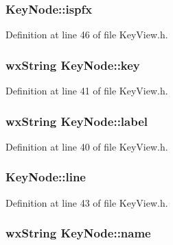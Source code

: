 \subsubsection[{\texorpdfstring{ispfx}{ispfx}}]{ Key\+Node\+::ispfx}\hypertarget{class_key_node_abfc291ad3728582c410dafe5796510cb}{}\label{class_key_node_abfc291ad3728582c410dafe5796510cb}


Definition at line 46 of file Key\+View.\+h.

\subsubsection[{\texorpdfstring{key}{key}}]{\setlength{\rightskip}{0pt plus 5cm}wx\+String Key\+Node\+::key}\hypertarget{class_key_node_a6c7cfedf027aa5f0dc8d5312ede8df73}{}\label{class_key_node_a6c7cfedf027aa5f0dc8d5312ede8df73}


Definition at line 41 of file Key\+View.\+h.

\subsubsection[{\texorpdfstring{label}{label}}]{\setlength{\rightskip}{0pt plus 5cm}wx\+String Key\+Node\+::label}\hypertarget{class_key_node_a2b822fe077db30c7aa9b7614d5dc7d4d}{}\label{class_key_node_a2b822fe077db30c7aa9b7614d5dc7d4d}


Definition at line 40 of file Key\+View.\+h.

\subsubsection[{\texorpdfstring{line}{line}}]{ Key\+Node\+::line}\hypertarget{class_key_node_afcac12846f195ed3b2ce7ac44775c4ce}{}\label{class_key_node_afcac12846f195ed3b2ce7ac44775c4ce}


Definition at line 43 of file Key\+View.\+h.

\subsubsection[{\texorpdfstring{name}{name}}]{\setlength{\rightskip}{0pt plus 5cm}wx\+String Key\+Node\+::name}\hypertarget{class_key_node_aa4f39178ff49fceb6b1f1882aa9f5db5}{}\label{class_key_node_aa4f39178ff49fceb6b1f1882aa9f5db5}


